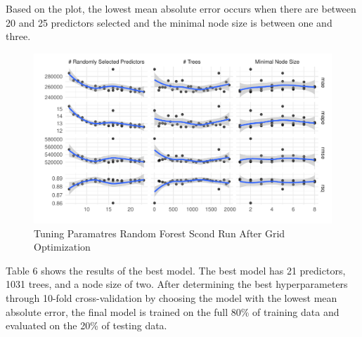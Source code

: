 \documentclass[
]{article}
\begin{document}
Based on the plot, the lowest mean absolute error occurs when there are
between 20 and 25 predictors selected and the minimal node size is
between one and three.

\begin{figure}
\centering
\includegraphics{final_report_files/figure-latex/unnamed-chunk-24-1.pdf}
\caption{Tuning Paramatres Random Forest Scond Run After Grid
Optimization}
\end{figure}

Table 6 shows the results of the best model. The best model has 21
predictors, 1031 trees, and a node size of two. After determining the
best hyperparameters through 10-fold cross-validation by choosing the
model with the lowest mean absolute error, the final model is trained on
the full 80\% of training data and evaluated on the 20\% of testing
data.
\end{document}
